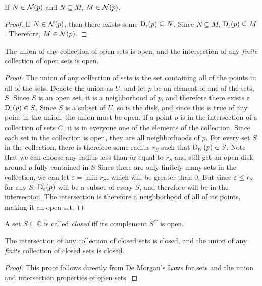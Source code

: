 \begin{lemma}
If $N \in \nbhd{p}$ and $N \subseteq M$, $M \in \nbhd{p}$.
\end{lemma}
\begin{proof}
If $N \in \nbhd{p}$, then there exists some $\disk{p}{r} \subseteq N$. Since $N \subseteq M$, $\disk{p}{r} \subseteq M$. Therefore, $M \in \nbhd{p}$.
\end{proof}
\begin{lemma}
The union of any collection of open sets is open, and the intersection of any \emph{finite} collection of open sets is open.
\end{lemma}
\begin{proof}
The union of any collection of sets is the set containing all of the points in all of the sets. Denote the union as $U$, and let $p$ be an element of one of the sets, $S$. Since $S$ is an open set, it is a neighborhood of $p$, and therefore there exists a $\disk{p}{r} \in S$.
Since $S$ is a subset of $U$, so is the disk, and since this is true of any point in the union, the union must be open.
If a point $p$ is in the intersection of a collection of sets $C$, it is in everyone one of the elements of the collection. Since each set in the collection is open, they are all neighborhoods of $p$. For every set $S$ in the collection, there is therefore some radius $r_S$ such that $\disk{p}{r_S} \in S$. Note that we can choose any radius less than or equal to $r_S$ and still get an open disk around $p$ fully contained in $S$
Since there are only finitely many sets in the collection, we can let $\varepsilon = \min r_S$, which will be greater than $0$. But since $\varepsilon \leq r_S$ for any $S$, $\disk{p}{\varepsilon}$ will be a subset of every $S$, and therefore will be in the intersection. The intersection is therefore a neighborhood of all of its points, making it an open set. 
\end{proof}
\begin{definition}
A set $S \subseteq \mathbb{C}$ is called \emph{closed} iff its complement $S^C$ is open.
\end{definition}
\begin{lemma}
The intersection of any collection of closed sets is closed, and the union of any \emph{finite} collection of closed sets is closed.
\end{lemma}
\begin{proof}
This proof follows directly from De Morgan's Laws for sets and \hyperlink{Properties of Open Sets}{the union and intersection properties of open sets}.
\end{proof}
